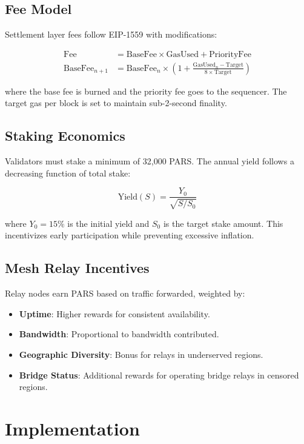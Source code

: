 \documentclass[11pt,a4paper,twocolumn]{article}
\begin{document}
\subsection{Fee Model}

Settlement layer fees follow EIP-1559 with modifications:

\begin{align}
  \text{Fee} &= \text{BaseFee} \times \text{GasUsed} + \text{PriorityFee} \\
  \text{BaseFee}_{n+1} &= \text{BaseFee}_n \times \left(1 + \frac{\text{GasUsed}_n - \text{Target}}{8 \times \text{Target}}\right)
\end{align}

where the base fee is burned and the priority fee goes to the sequencer. The target gas per block is set to maintain sub-2-second finality.

\subsection{Staking Economics}

Validators must stake a minimum of 32,000 PARS. The annual yield follows a decreasing function of total stake:

$$\text{Yield}(S) = \frac{Y_0}{\sqrt{S/S_0}}$$

where $Y_0 = 15\%$ is the initial yield and $S_0$ is the target stake amount. This incentivizes early participation while preventing excessive inflation.

\subsection{Mesh Relay Incentives}

Relay nodes earn PARS based on traffic forwarded, weighted by:
\begin{itemize}
  \item \textbf{Uptime}: Higher rewards for consistent availability.
  \item \textbf{Bandwidth}: Proportional to bandwidth contributed.
  \item \textbf{Geographic Diversity}: Bonus for relays in underserved regions.
  \item \textbf{Bridge Status}: Additional rewards for operating bridge relays in censored regions.
\end{itemize}

\section{Implementation}
\label{sec:implementation}
\end{document}
